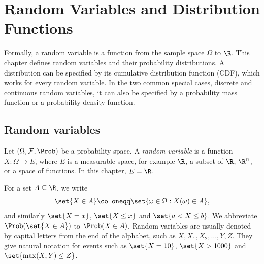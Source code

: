 \chapter{Random Variables and Distribution Functions}\label{ch:random-variables}



Formally, a random variable is a function from the sample space $\Omega$ to $\R$. This chapter defines random variables and their probability distributions. A distribution can be specified by its cumulative distribution function (CDF), which works for every random variable. In the two common special cases, discrete and continuous random variables, it can also be specified by a probability mass function or a probability density function.

\section{Random variables}\label{sec:random-variables}

\begin{definition}\label{def:random-variable}
Let $(\Omega, \mathcal{F}, \Prob)$ be a probability space. A \emph{random variable} is a function $X \colon \Omega \to E$, where $E$ is a measurable space, for example $\R$, a subset of $\R$, $\R^n$, or a space of functions. In this chapter, $E = \R$.
\end{definition}

For a set $A \subseteq \R$, we write
\[
  \set{X \in A} \coloneqq \set{\omega \in \Omega : X(\omega) \in A},
\]
and similarly $\set{X = x}$, $\set{X \le x}$ and $\set{a < X \le b}$. We abbreviate $\Prob(\set{X \in A})$ to $\Prob(X \in A)$. Random variables are usually denoted by capital letters from the end of the alphabet, such as $X, X_1, X_2, \ldots, Y, Z$. They give natural notation for events such as $\set{X = 10}$, $\set{X > 1000}$ and $\set{\max(X, Y) \le Z}$.

